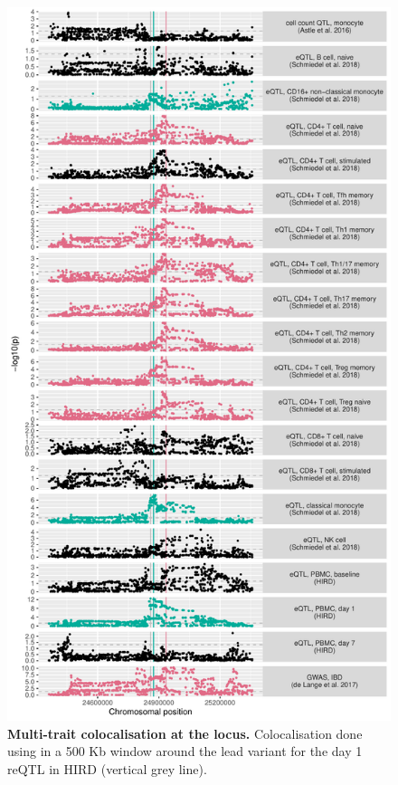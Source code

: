 \begin{figure}
    \centering
    \includegraphics[width=1.0\textwidth,page=1]{mainmatter/figures/chapter_03/perform_coloc.gene_ENSG00000138031.locusPlot.pdf}
    \caption{
        \textbf{Multi-trait colocalisation at the  locus.}
        Colocalisation done using  \autocite{foley2019FastEfficientColocalization} in a 500 Kb window around the lead variant for the day 1  \gls{reQTL} in \gls{HIRD} (vertical grey line).
}
\end{figure}
